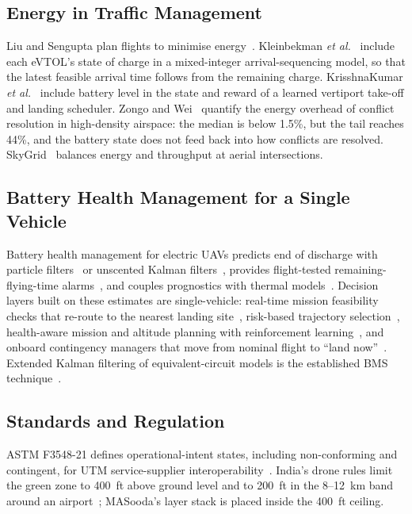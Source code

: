 \documentclass[journal]{IEEEtran}
\begin{document}
\subsection{Energy in Traffic Management}
Liu and Sengupta plan flights to minimise energy~\cite{liu2017energy}. Kleinbekman \textit{et al.}~\cite{kleinbekman2018evtol} include each eVTOL's state of charge in a mixed-integer arrival-sequencing model, so that the latest feasible arrival time follows from the remaining charge. KrisshnaKumar \textit{et al.}~\cite{krisshnakumar2023vertiport} include battery level in the state and reward of a learned vertiport take-off and landing scheduler. Zongo and Wei~\cite{zongo2026overhead} quantify the energy overhead of conflict resolution in high-density airspace: the median is below 1.5\%, but the tail reaches 44\%, and the battery state does not feed back into how conflicts are resolved. SkyGrid~\cite{khoshdel2024skygrid} balances energy and throughput at aerial intersections.

\subsection{Battery Health Management for a Single Vehicle}
Battery health management for electric UAVs predicts end of discharge with particle filters~\cite{saha2011bhm} or unscented Kalman filters~\cite{bole2014online}, provides flight-tested remaining-flying-time alarms~\cite{kulkarni2018remaining,hogge2024octocopter}, and couples prognostics with thermal models~\cite{kulkarni2024thermal}. Decision layers built on these estimates are single-vehicle: real-time mission feasibility checks that re-route to the nearest landing site~\cite{taye2025safe}, risk-based trajectory selection~\cite{quinones2020decision}, health-aware mission and altitude planning with reinforcement learning~\cite{montazeri2024health}, and onboard contingency managers that move from nominal flight to ``land now''~\cite{baculi2019onboard}. Extended Kalman filtering of equivalent-circuit models is the established BMS technique~\cite{plett2004ekf,plett2015bms}.

\subsection{Standards and Regulation}
ASTM F3548-21 defines operational-intent states, including non-conforming and contingent, for UTM service-supplier interoperability~\cite{astmF3548}. India's drone rules limit the green zone to 400~ft above ground level and to 200~ft in the 8--12~km band around an airport~\cite{pib2021drone}; MASooda's layer stack is placed inside the 400~ft ceiling.
\end{document}
